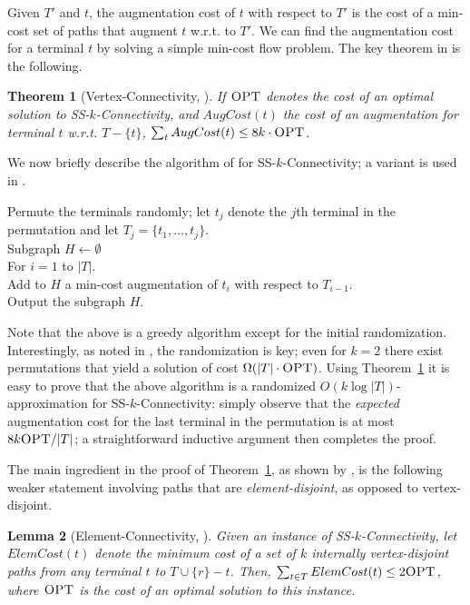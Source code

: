 \documentclass[11pt]{article}
\newtheorem{lemma}{Lemma}[section]
\newtheorem{theorem}[lemma]{Theorem}
\newcommand{\opt}{\text{\sc OPT}}
\newcommand{\sskconn}{{\sc SS-$k$-Connectivity}}
\begin{document}
Given $T'$ and $t$, the augmentation cost of $t$ with respect to $T'$
is the cost of a min-cost set of paths that augment $t$ w.r.t. to
$T'$. We can find the augmentation cost for a terminal $t$ by solving
a simple min-cost flow problem. The key theorem in
\cite{ChuzhoyK08} is the following.

\begin{theorem}[Vertex-Connectivity, \cite{ChuzhoyK08}] 
  \label{thm:kconnAug}
  If $\opt$ denotes the cost of an optimal solution to \sskconn, and
  $AugCost(t)$ the cost of an augmentation for terminal $t$ w.r.t. $T
  - \{t\}$, $\sum_t AugCost(t) \le 8k \cdot \opt$.
\end{theorem}

We now briefly describe the algorithm of \cite{ChekuriK08} for
\sskconn; a variant is used in \cite{ChakCK08, ChuzhoyK08}. 

\vspace{-0.1in}
\begin{algo}
  Permute the terminals randomly; let $t_j$ denote the $j$th terminal in
  the permutation and let $T_j = \{t_1, \ldots, t_j\}$. \\
  Subgraph $H \leftarrow \emptyset$\\
  For $i = 1$ to $|T|$. \+ \\
    Add to $H$ a min-cost augmentation of $t_i$ with respect to
    $T_{i-1}$. \- \\
  Output the subgraph $H$.
\end{algo}

Note that the above is a greedy algorithm except for the initial
randomization. Interestingly, as noted in \cite{ChekuriK08}, the
randomization is key; even for $k=2$ there exist permutations that
yield a solution of cost $\Omega(|T| \cdot \opt)$. Using
Theorem~\ref{thm:kconnAug} it is easy to prove that the above
algorithm is a randomized $O(k \log |T|)$-approximation for \sskconn:
simply observe that the \emph{expected} augmentation cost for the last
terminal in the permutation is at most $8k \opt/|T|$; a
straightforward inductive argument then completes the proof. 


The main ingredient in the proof of Theorem~\ref{thm:kconnAug}, as
shown by \cite{ChuzhoyK08}, is the following weaker statement
involving paths that are \emph{element-disjoint}, as opposed to
vertex-disjoint.

\begin{lemma}[Element-Connectivity, \cite{ChuzhoyK08}]
  \label{lem:elemConnectivity}
  Given an instance of \sskconn, let $ElemCost(t)$ denote the minimum
  cost of a set of $k$ internally vertex-disjoint paths from any terminal
  $t$ to $T \cup \{r\} - t$. Then, $\sum_{t \in T} ElemCost(t) \le 2
  \opt$, where $\opt$ is the cost of an optimal solution to this
  instance.
\end{lemma}
\end{document}
